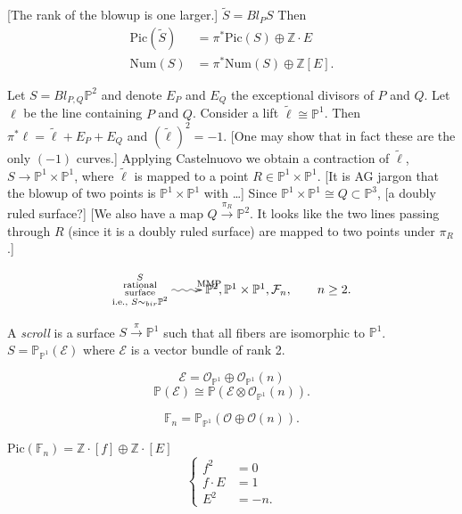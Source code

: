 \begin{remark}
\label{remark-pic-number}
[The rank of the blowup is one larger.]
$\tilde{S}=Bl_PS$ Then
$$
\begin{aligned}
\text{Pic}(\tilde{S})&=\pi^*\text{Pic}(S)
\oplus \mathbb{Z}\cdot E\\
\text{Num}(S)&=\pi^*\text{Num}(S) \oplus
\mathbb{Z}[E].
\end{aligned}
$$
\end{remark}


\begin{example}
\label{example-arrive-at-different-surfaces}
Let $S= Bl_{P,Q}\mathbb{P}^2$ and denote
$E_P$ and $E_Q$ the exceptional divisors of
$P$ and $Q$.
Let $\ell$ be the line containing $P$ and
$Q$.
Consider a lift  $\tilde{\ell} \cong
\mathbb{P}^1$.
Then $\pi^* \ell = \tilde{\ell}+E_P+E_Q$
and $(\tilde{\ell})^2=-1$.
[One may show that in fact these are the only
$(-1)$ curves.]
Applying Castelnuovo we obtain a contraction
of $\tilde{\ell}$,
$S \to \mathbb{P}^1\times \mathbb{P}^1$,
where $\tilde{\ell}$ is mapped to a point
$R \in \mathbb{P}^1 \times\mathbb{P}^1$.
[It is AG jargon that the blowup of two
points is $\mathbb{P}^1\times
\mathbb{P}^1$
with …]
Since $\mathbb{P}^1 \times \mathbb{P}^1 \cong
Q \subset \mathbb{P}^3$,
[a doubly ruled surface?]
[We also have a map $Q \xrightarrow{\pi_R}
\mathbb{P}^2$.
It looks like the two lines passing through
$R$
(since it is a doubly ruled surface)
are mapped to two points under  $\pi_R$.]
\end{example}

$$
\xymatrix{
\substack{S \\
\text{rational}\\\text{surface}\\
\text{i.e., }S \sim_{bir}\mathbb{P}^2}
\ar@{~>}[r]^{\text{MMP}}
&\mathbb{P}^2,\mathbb{P}^1\times
\mathbb{P}^1, \mathcal{F}_n,
\qquad  n\geq 2.
}
$$
\begin{definition}
\label{definition-scroll}
A {\it scroll} is a surface $S
\xrightarrow{\pi}\mathbb{P}^1$
such that all fibers are isomorphic to
$\mathbb{P}^1$.
$S= \mathbb{P}_{\mathbb{P}^1}(\mathcal{E})$
where $\mathcal{E}$ is a vector bundle of
rank 2.

$$
\mathcal{E}=\mathcal{O}_{\mathbb{P}^1}\oplus
\mathcal{O}_{\mathbb{P}^1}(n)
$$
$$
\mathbb{P}(\mathcal{E}) \cong
\mathbb{P}(\mathcal{E} \otimes
\mathcal{O}_{\mathbb{P}^1}(n)).
$$
\end{definition}
$$
\mathbb{F}_n=\mathbb{P}_{\mathbb{P}^1}
(\mathcal{O}
\oplus \mathcal{O}(n)).
$$
\begin{exercise}
\label{exercise-inter-theor-hirze}
$\text{Pic}(\mathbb{F}_n)=\mathbb{Z}\cdot[f]
\oplus \mathbb{Z}\cdot[E]$
$$
\begin{cases}
f^2&=0\\
f\cdot E &= 1\\
E^2&=-n.
\end{cases}
$$

\end{exercise}

